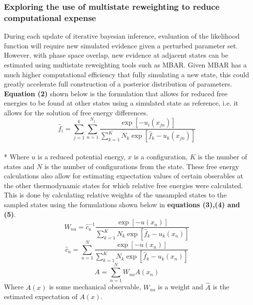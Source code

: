 \documentclass[rmp,nofootinbib,superscriptaddress,12pt,tightenlines,notitlepage]{revtex4-1}
\begin{document}
\subsubsection{Exploring the use of multistate reweighting to reduce computational expense}
During each update of iterative bayesian inference, evaluation of the likelihood function will require new simulated evidence given a perturbed parameter set. However, with phase space overlap, new evidence at adjacent states can be estimated using multistate reweighting tools such as MBAR. \cite{mbar} Given MBAR has a much higher computational efficiency that fully simulating a new state, this could greatly accelerate full construction of a posterior distribution of parameters. \textbf{Equation (2)} shown below is the formulation that allows for reduced free energies to be found at other states using a simulated state as reference, i.e. it allows for the solution of free energy differences.
\begin{equation} \hat{f}_i = \sum_{j=1}^{k}\sum_{n=1}^{N_j} \frac{\exp\left[-u_{i}\left(x_{jn}\right)\right]}{\sum_{k=1}^{K} N_k \exp\left[\hat{f}_k - u_{k}\left(x_{jn}\right)\right]}\end{equation}\\*
Where $u$ is a reduced potential energy, $x$ is a configuration, $K$ is the number of states and $N$ is the number of configurations from the state. These free energy calculations also allow for estimating expectation values of certain obserables at the other thermodynamic states for which relative free energies were calculated. This is done by calculating relative weights of the unsampled states to the sampled states using the formulations shown below in \textbf{equations (3),(4) and (5)}.
\begin{equation} W_{na} = \hat{c}_{a}^{-1} \frac{\exp\left[-u\left(x_{n}\right)\right]}{\sum_{k=1}^{K} N_k \exp\left[\hat{f}_k - u_{k}\left(x_{n}\right)\right]}\end{equation}
\begin{equation} \hat{c}_a = \sum_{n=1}^{N} \frac{\exp\left[-u\left(x_{n}\right)\right]}{\sum_{k=1}^{K} N_k \exp\left[\hat{f}_k - u_{k}\left(x_{n}\right)\right]}\end{equation}
\begin{equation} \hat{A} = \sum_{n=1}^{N} W_{na} A\left(x_n\right)\end{equation}
Where $A(x)$ is some mechanical observable, $W_{na}$ is a weight and $\hat{A}$ is the estimated expectation of $A(x)$. 
\end{document}

